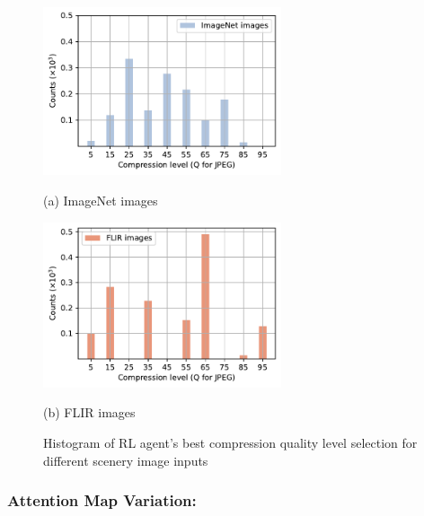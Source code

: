 
\begin{figure}[!t]
{\color{revise}
	\begin{minipage}[t]{0.48\linewidth}
		\centerline{\includegraphics[width=7cm]{figures/ImageNet_Baidu_choices.pdf}}
		\centerline{(a) ImageNet images}
	\end{minipage}
	\hfill
	\begin{minipage}[t]{0.48\linewidth}
		\centerline{\includegraphics[width=7cm]{figures/FLIR_Baidu_choices.pdf}}
		\centerline{(b) FLIR images}
	\end{minipage}	
    \caption{\textcolor{revise}{Histogram of RL agent's best compression quality level selection for different scenery image inputs}}
	\label{fig: dataset_change}
}
\end{figure}

\subsubsection{Attention Map Variation:}
\label{subsec: attention map}

